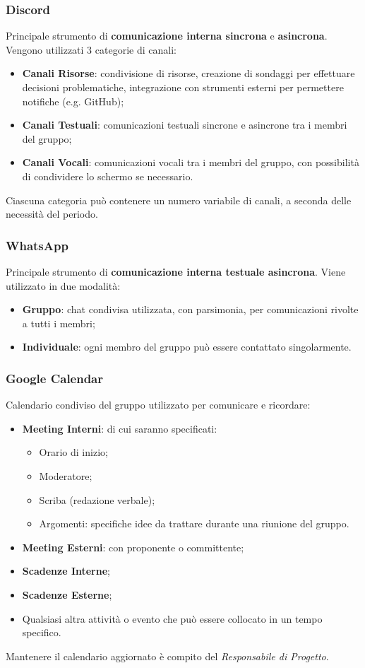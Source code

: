 \subsubsection{Discord}
Principale strumento di \textbf{comunicazione interna sincrona} e \textbf{asincrona}. Vengono utilizzati 3 categorie di canali:
\begin{itemize}
  \item \textbf{Canali Risorse}: condivisione di risorse, creazione di sondaggi per effettuare decisioni problematiche, integrazione con strumenti esterni per permettere notifiche (e.g. GitHub);
  \item \textbf{Canali Testuali}: comunicazioni testuali sincrone e asincrone tra i membri del gruppo;
  \item \textbf{Canali Vocali}: comunicazioni vocali tra i membri del gruppo, con possibilità di condividere lo schermo se necessario.
\end{itemize}
Ciascuna categoria può contenere un numero variabile di canali, a seconda delle necessità del periodo.

\subsubsection{WhatsApp}
Principale strumento di \textbf{comunicazione interna testuale asincrona}. Viene utilizzato in due modalità:
\begin{itemize}
  \item \textbf{Gruppo}: chat condivisa utilizzata, con parsimonia, per comunicazioni rivolte a tutti i membri;
  \item \textbf{Individuale}: ogni membro del gruppo può essere contattato singolarmente.
\end{itemize}

\subsubsection{Google Calendar}
Calendario condiviso del gruppo utilizzato per comunicare e ricordare:
\begin{itemize}
  \item \textbf{Meeting Interni}: di cui saranno specificati:
  \begin{itemize}
    \item Orario di inizio;
    \item Moderatore;
    \item Scriba (redazione verbale);
    \item Argomenti: specifiche idee da trattare durante una riunione del gruppo.
  \end{itemize}
  \item \textbf{Meeting Esterni}: con proponente o committente;
  \item \textbf{Scadenze Interne};
  \item \textbf{Scadenze Esterne};
  \item Qualsiasi altra attività o evento che può essere collocato in un tempo specifico.
\end{itemize}
Mantenere il calendario aggiornato è compito del \textit{Responsabile di Progetto}.

